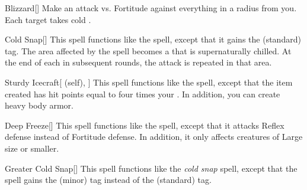 \lowercase{\hypertarget{spell:Blizzard}{}}\label{spell:Blizzard}
\begin{freeability}[\nth{2}]{\hypertarget{spell:Blizzard}{Blizzard}}[]
Make an attack vs. Fortitude against everything in a \areamed radius from you.
\hit Each target takes cold .
\end{freeability}
\vspace{0.25em}



\lowercase{\hypertarget{spell:Cold Snap}{}}\label{spell:Cold Snap}
\begin{freeability}[\nth{2}]{\hypertarget{spell:Cold Snap}{Cold Snap}}[]
This spell functions like the  spell, except that it gains the  (standard) tag.
The area affected by the spell becomes a  that is supernaturally chilled.
At the end of each  in subsequent rounds, the attack is repeated in that area.
\end{freeability}
\vspace{0.25em}



\lowercase{\hypertarget{spell:Sturdy Icecraft}{}}\label{spell:Sturdy Icecraft}
\begin{attuneability}[\nth{2}]{\hypertarget{spell:Sturdy Icecraft}{Sturdy Icecraft}}[ (self), ]
This spell functions like the  spell, except that the item created has hit points equal to four times your .
In addition, you can create heavy body armor.
\end{attuneability}
\vspace{0.25em}



\lowercase{\hypertarget{spell:Deep Freeze}{}}\label{spell:Deep Freeze}
\begin{freeability}[\nth{3}]{\hypertarget{spell:Deep Freeze}{Deep Freeze}}[]
This spell functions like the  spell, except that it attacks Reflex defense instead of Fortitude defense.
In addition, it only affects creatures of Large size or smaller.
\end{freeability}
\vspace{0.25em}



\lowercase{\hypertarget{spell:Greater Cold Snap}{}}\label{spell:Greater Cold Snap}
\begin{freeability}[\nth{3}]{\hypertarget{spell:Greater Cold Snap}{Greater Cold Snap}}[]
This spell functions like the \textit{cold snap} spell, except that the spell gains the  (minor) tag instead of the  (standard) tag.
\end{freeability}
\vspace{0.25em}



